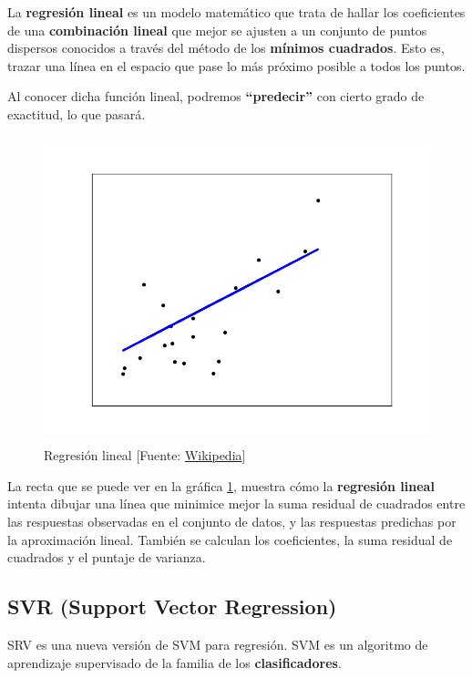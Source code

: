 	La \textbf{regresión lineal} es un modelo matemático que trata de hallar los coeficientes de una \textbf{combinación lineal} que mejor se ajusten a un conjunto de puntos dispersos conocidos a través del método de los \textbf{mínimos cuadrados}. Esto es, trazar una línea en el espacio que pase lo más próximo posible a todos los puntos.

	Al conocer dicha función lineal, podremos \textbf{``predecir''} con cierto grado de exactitud, lo que pasará.

	\begin{figure}[htb]
		
		\begin{center}
			\includegraphics[height=3.5in]{figures/regression.png}
			\caption{Regresión lineal [Fuente: \href{www.wikipedia.org}{Wikipedia}]}
		\end{center}
		
		\label{regression}
	\end{figure}
	
	La recta que se puede ver en la gráfica \ref{regression}, muestra cómo la \textbf{regresión lineal} intenta dibujar una línea que minimice mejor la suma residual de cuadrados entre las respuestas observadas en el conjunto de datos, y las respuestas predichas por la aproximación lineal.
	También se calculan los coeficientes, la suma residual de cuadrados y el puntaje de varianza.

	\subsection{SVR (Support Vector Regression)}
	\label{makereference4.3.2}

	SRV es una nueva versión de SVM para regresión. SVM es un algoritmo de aprendizaje supervisado de la familia de los \textbf{clasificadores}.

